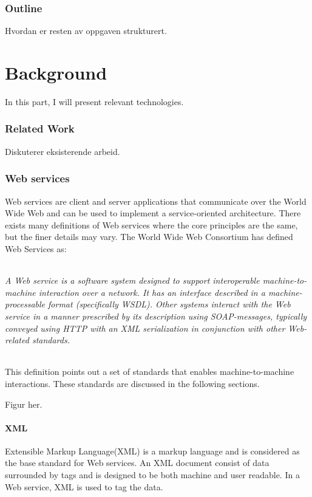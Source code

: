 \documentclass[USenglish]{article}
\begin{document}
\section{Outline}
Hvordan er resten av oppgaven strukturert.


\part{Background}
In this part, I will present relevant technologies.
\section{Related Work}
Diskuterer eksisterende arbeid.



\section{Web services}
\label{web-services}
Web services are client and server applications that communicate over the World Wide Web and can be used to implement a service-oriented architecture. There exists many definitions of Web services where the core principles are the same, but the finer details may vary. The World Wide Web Consortium has defined Web Services as\cite{wrc-web-service}:
\paragraph{}
\textit{A Web service is a software system designed to support interoperable machine-to-machine interaction over a network. It has an interface described in a machine-processable format (specifically WSDL). Other systems interact with the Web service in a manner prescribed by its description using SOAP-messages, typically conveyed using HTTP with an XML serialization in conjunction with other Web-related standards.}

\paragraph{}
This definition points out a set of standards that enables machine-to-machine interactions. These standards are discussed in the following sections.

Figur her.

\subsection{XML}
Extensible Markup Language(XML) is a markup language and is considered as the base standard for Web services. An XML document consist of data surrounded by tags and is designed to be both machine and user readable. In a Web service, XML is used to tag the data.
\end{document}
